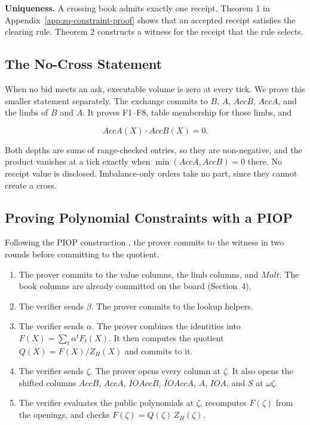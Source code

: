 \textbf{Uniqueness.} A crossing book admits exactly one receipt. Theorem 1 in Appendix~\ref{app:zq-constraint-proof} shows that an accepted receipt satisfies the clearing rule. Theorem 2 constructs a witness for the receipt that the rule selects.

\subsection{The No-Cross Statement}

When no bid meets an ask, executable volume is zero at every tick. We prove this smaller statement separately. The exchange commits to \(B\), \(A\), \(AccB\), \(AccA\), and the limbs of \(B\) and \(A\). It proves F1--F8, table membership for those limbs, and

\[AccA(X) \cdot AccB(X) = 0.\]

Both depths are sums of range-checked entries, so they are non-negative, and the product vanishes at a tick exactly when \(\min(AccA, AccB) = 0\) there. No receipt value is disclosed. Imbalance-only orders take no part, since they cannot create a cross.


\subsection{Proving Polynomial Constraints with a PIOP}
\label{app:piop}


Following the PIOP construction \cite{GWC19}, the prover commits to the witness in two rounds before committing to the quotient.

\begin{enumerate}
\renewcommand{\labelenumi}{\arabic{enumi}.}
\raggedright

\item The prover commits to the value columns, the limb columns, and
      \(Mult\). The book columns are already committed on the board
      (Section~4).

\item The verifier sends \(\beta\). The prover commits to the lookup
      helpers.

\item The verifier sends \(\alpha\). The prover combines the identities
      into \mbox{\(F(X) = \sum_t \alpha^t F_t(X)\)}. It then computes
      the quotient \mbox{\(Q(X) = F(X)/Z_H(X)\)} and commits to it.

\item The verifier sends \(\zeta\). The prover opens every column at
      \(\zeta\). It also opens the shifted columns \(AccB\), \(AccA\),
      \(IOAccB\), \(IOAccA\), \(A\), \(IOA\), and \(S\) at
      \(\omega\zeta\).

\item The verifier evaluates the public polynomials at \(\zeta\),
      recomputes \(F(\zeta)\) from the openings, and checks
      \mbox{\(F(\zeta) = Q(\zeta)\,Z_H(\zeta)\)}.

\end{enumerate}

